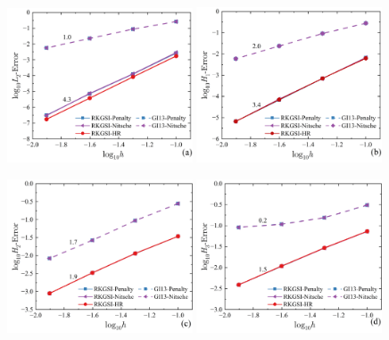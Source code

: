 \begin{figure}[H]
    \centering
    \begin{subcaptiongroup}
    \includegraphics[width=0.49\textwidth]{figure/PHR/T/CL2.png}
    \label{TCL2}
    \includegraphics[width=0.49\textwidth]{figure/PHR/T/CH1.png}
    \label{TCH1}
    \end{subcaptiongroup}
    \begin{subcaptiongroup}
    \includegraphics[width=0.49\textwidth]{figure/PHR/T/CH2.png}
    \label{TCH2}
    \includegraphics[width=0.49\textwidth]{figure/PHR/T/CH3.png}
    \label{TCH3}
    \end{subcaptiongroup}
\caption{}
\label{TCLH}
\end{figure}
